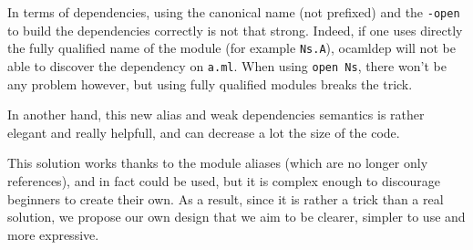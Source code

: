 In terms of dependencies, using the canonical name (not prefixed) and the
\texttt{-open} to build the dependencies correctly is not that strong. Indeed,
if one uses directly the fully qualified name of the module (for example
\texttt{Ns.A}), ocamldep will not be able to discover the dependency on
\texttt{a.ml}. When using \lstinline{open Ns}, there won't be any problem
however, but using fully qualified modules breaks the trick. 

In another hand, this new alias and weak dependencies semantics is rather
elegant and really helpfull, and can decrease a lot the size of the code.

This solution works thanks to the module aliases (which are no longer only
references), and in fact could be used, but it is complex enough to discourage
beginners to create their own. As a result, since it is rather a trick than a
real solution, we propose our own design that we aim to be clearer, simpler to
use and more expressive.
